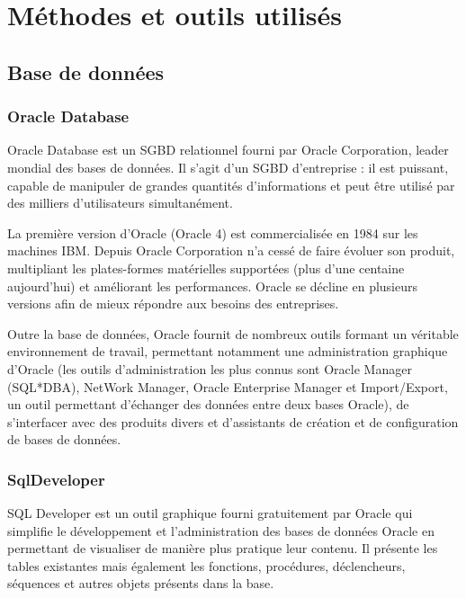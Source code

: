\cleardoublepage
{}

\chapter{Méthodes et outils utilisés}



\section{Base de données}

	\subsection{Oracle Database}
		Oracle Database est un SGBD relationnel fourni par Oracle Corporation, leader mondial des bases de données. Il s\rq{}agit d\rq{}un SGBD d'entreprise : il est puissant, capable de manipuler de grandes quantités d'informations et peut être utilisé par des milliers d'utilisateurs simultanément.
		
		La première version d'Oracle (Oracle 4) est commercialisée en 1984 sur les machines IBM. Depuis Oracle Corporation n\rq{}a cessé de faire évoluer son produit, multipliant les plates-formes matérielles supportées (plus d'une centaine aujourd\rq{}hui) et améliorant les performances. Oracle se décline en plusieurs versions afin de mieux répondre aux besoins des entreprises.
		
		Outre la base de données, Oracle fournit de nombreux outils formant un véritable environnement de travail, permettant notamment une administration graphique d'Oracle (les outils d\rq{}administration les plus connus sont Oracle Manager (SQL*DBA), NetWork Manager, Oracle Enterprise Manager et Import/Export, un outil permettant d'échanger des données entre deux bases Oracle), de s'interfacer avec des produits divers et d'assistants de création et de configuration de bases de données.
	
	
	\subsection{SqlDeveloper}
		SQL Developer est un outil graphique fourni gratuitement par Oracle qui simplifie le développement et l\rq{}administration des bases de données Oracle en permettant de visualiser de manière plus pratique leur contenu. Il présente les tables existantes mais également les fonctions, procédures, déclencheurs, séquences et autres objets présents dans la base.
		
